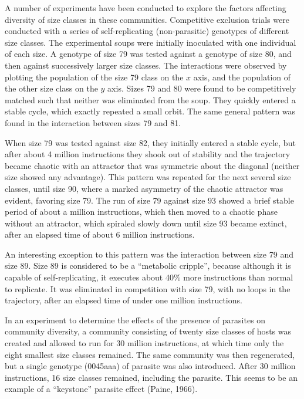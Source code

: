 A number of experiments have been conducted to explore the factors affecting
diversity of size classes in these communities.  Competitive exclusion trials
were conducted with a series of self-replicating (non-parasitic) genotypes
of different size classes.  The experimental soups were initially inoculated
with one individual of each size.  A genotype of size 79 was tested against a
genotype of size 80, and then against successively larger size classes.  The
interactions were observed by plotting the population of the size 79 class
on the $x$ axis, and the population of the other size class on the $y$ axis.
Sizes 79 and 80 were found to be competitively matched such that neither was
eliminated from the soup.  They quickly entered a stable cycle, which exactly
repeated a small orbit.  The same general pattern was found in the interaction
between sizes 79 and 81.

When size 79 was tested against size 82, they initially entered a stable
cycle, but after about 4 million instructions they shook out of stability
and the trajectory became chaotic with an attractor that was symmetric about
the diagonal (neither size showed any advantage).  This pattern was repeated
for the next several size classes, until size 90, where a marked asymmetry of
the chaotic attractor was evident, favoring size 79.  The run of size 79
against size 93 showed a brief stable period of about a million instructions,
which then moved to a chaotic phase without an attractor, which spiraled
slowly down until size 93 became extinct, after an elapsed time of about 6
million instructions.

An interesting exception to this pattern was the interaction between size 79
and size 89.  Size 89 is considered to be a ``metabolic cripple'', because
although it is capable of self-replicating, it executes about 40\% more
instructions than normal to replicate.  It was eliminated in competition
with size 79, with no loops in the trajectory, after an elapsed time of
under one million instructions.

In an experiment to determine the effects of the presence of parasites on
community diversity, a community consisting of twenty size classes of hosts
was created and allowed to run for 30 million instructions, at which time only
the eight smallest size classes remained.  The same community was then
regenerated, but a single genotype (0045aaa) of parasite was also introduced.
After 30 million instructions, 16 size classes remained, including the
parasite.  This seems to be an example of a ``keystone'' parasite effect
(Paine, 1966).

